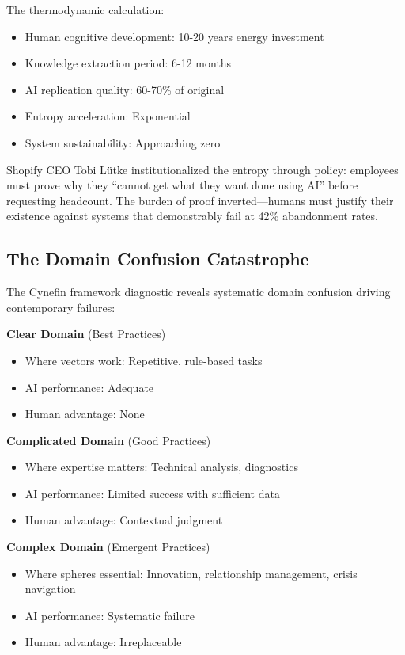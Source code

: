 The thermodynamic calculation:
\begin{itemize}
\item Human cognitive development: 10-20 years energy investment
\item Knowledge extraction period: 6-12 months
\item AI replication quality: 60-70\% of original
\item Entropy acceleration: Exponential
\item System sustainability: Approaching zero
\end{itemize}

Shopify CEO Tobi Lütke institutionalized the entropy through policy: employees must prove why they ``cannot get what they want done using AI'' before requesting headcount. The burden of proof inverted---humans must justify their existence against systems that demonstrably fail at 42\% abandonment rates.

\subsection{The Domain Confusion Catastrophe}

The Cynefin framework diagnostic reveals systematic domain confusion driving contemporary failures:

\textbf{Clear Domain} (Best Practices)
\begin{itemize}
\item Where vectors work: Repetitive, rule-based tasks
\item AI performance: Adequate
\item Human advantage: None
\end{itemize}

\textbf{Complicated Domain} (Good Practices)
\begin{itemize}
\item Where expertise matters: Technical analysis, diagnostics
\item AI performance: Limited success with sufficient data
\item Human advantage: Contextual judgment
\end{itemize}

\textbf{Complex Domain} (Emergent Practices)
\begin{itemize}
\item Where spheres essential: Innovation, relationship management, crisis navigation
\item AI performance: Systematic failure
\item Human advantage: Irreplaceable
\end{itemize}

